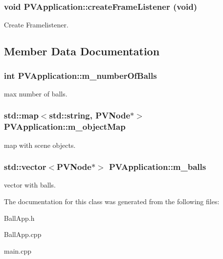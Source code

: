 \subsubsection[{createFrameListener}]{\setlength{\rightskip}{0pt plus 5cm}void PVApplication::createFrameListener (void)\hspace{0.3cm}{\tt  [protected]}}\label{class_p_v_application_f3c0a1a5ba0863381dc566387d5cea14}


Create Framelistener. 



\subsection{Member Data Documentation}
\subsubsection[{m\_\-numberOfBalls}]{\setlength{\rightskip}{0pt plus 5cm}int {\bf PVApplication::m\_\-numberOfBalls}}\label{class_p_v_application_a21695e21355042d06746c1b4dc921f8}


max number of balls. 

\subsubsection[{m\_\-objectMap}]{\setlength{\rightskip}{0pt plus 5cm}std::map$<$std::string, {\bf PVNode}$\ast$$>$ {\bf PVApplication::m\_\-objectMap}\hspace{0.3cm}{\tt  [protected]}}\label{class_p_v_application_391465236459221a65ba4361fa306db3}


map with scene objects. 

\subsubsection[{m\_\-balls}]{\setlength{\rightskip}{0pt plus 5cm}std::vector$<${\bf PVNode}$\ast$$>$ {\bf PVApplication::m\_\-balls}\hspace{0.3cm}{\tt  [protected]}}\label{class_p_v_application_80794ff58204fb039f2aa58ed0d157a1}


vector with balls. 



The documentation for this class was generated from the following files:\begin{CompactItemize}
\item 
BallApp.h\item 
BallApp.cpp\item 
main.cpp\end{CompactItemize}
